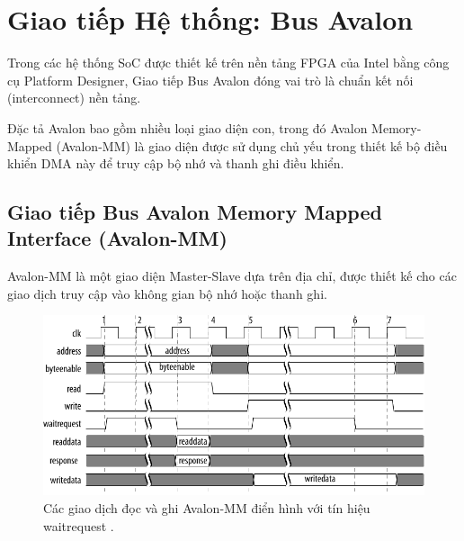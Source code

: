 \section{Giao tiếp Hệ thống: Bus Avalon}
\label{sec:avalon_bus}
Trong các hệ thống SoC được thiết kế trên nền tảng FPGA của Intel bằng công cụ Platform Designer, Giao tiếp Bus Avalon đóng vai trò là chuẩn kết nối (interconnect) nền tảng. 

Đặc tả Avalon bao gồm nhiều loại giao diện con, trong đó Avalon Memory-Mapped (Avalon-MM) là giao diện được sử dụng chủ yếu trong thiết kế bộ điều khiển DMA này để truy cập bộ nhớ và thanh ghi điều khiển.

\subsection{Giao tiếp Bus Avalon Memory Mapped Interface (Avalon-MM)}
Avalon-MM là một giao diện Master-Slave dựa trên địa chỉ, được thiết kế cho các giao dịch truy cập vào không gian bộ nhớ hoặc thanh ghi. 

\begin{figure}[htbp]
    \centering
    \includegraphics[width=\linewidth]{Images/02_01_Avalon_MM_Transfers.pdf}
    \caption{Các giao dịch đọc và ghi Avalon-MM điển hình với tín hiệu waitrequest \cite{avalon_mm_transfer}.}
    \label{fig:02_01_avalon_mm_transfer} %
\end{figure}

